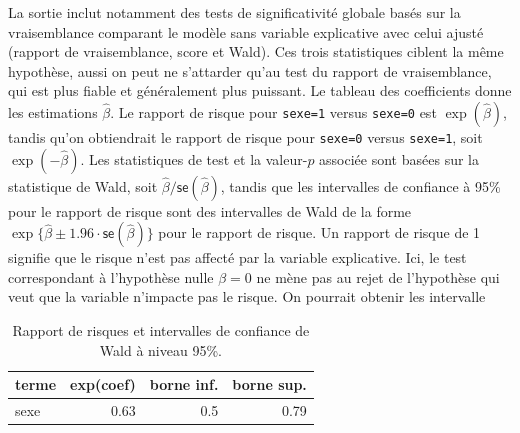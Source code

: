 \documentclass[
  11pt,
  letterpaper,
]{scrbook}
\theoremstyle{definition}
\theoremstyle{remark}
\begin{document}
La sortie inclut notamment des tests de significativité globale basés
sur la vraisemblance comparant le modèle sans variable explicative avec
celui ajusté (rapport de vraisemblance, score et Wald). Ces trois
statistiques ciblent la même hypothèse, aussi on peut ne s'attarder
qu'au test du rapport de vraisemblance, qui est plus fiable et
généralement plus puissant. Le tableau des coefficients donne les
estimations \(\widehat{\beta}\). Le rapport de risque pour
\texttt{sexe=1} versus \texttt{sexe=0} est \(\exp(\widehat{\beta})\),
tandis qu'on obtiendrait le rapport de risque pour \texttt{sexe=0}
versus \texttt{sexe=1}, soit \(\exp(-\widehat{\beta})\). Les
statistiques de test et la valeur-\(p\) associée sont basées sur la
statistique de Wald, soit
\(\widehat{\beta}/\mathsf{se}(\widehat{\beta})\), tandis que les
intervalles de confiance à 95\% pour le rapport de risque sont des
intervalles de Wald de la forme
\(\exp\{\widehat{\beta} \pm 1.96 \cdot \mathsf{se}(\widehat{\beta})\}\)
pour le rapport de risque. Un rapport de risque de 1 signifie que le
risque n'est pas affecté par la variable explicative. Ici, le test
correspondant à l'hypothèse nulle \(\beta=0\) ne mène pas au rejet de
l'hypothèse qui veut que la variable n'impacte pas le risque. On
pourrait obtenir les intervalle

\hypertarget{tbl-cox1}{}
\begin{table}
\caption{\label{tbl-cox1}Rapport de risques et intervalles de confiance de Wald à niveau 95\%. }\tabularnewline

\centering
\begin{tabular}{lrrr}
\toprule
terme & exp(coef) & borne inf. & borne sup.\\
\midrule
sexe & 0.63 & 0.5 & 0.79\\
\bottomrule
\end{tabular}
\end{table}
\end{document}
